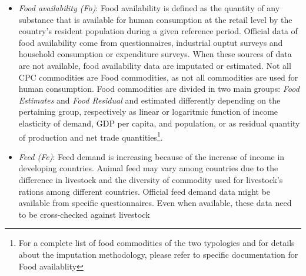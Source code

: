 \documentclass[]{article}
\let\rmarkdownfootnote\footnote%
\def\footnote{\protect\rmarkdownfootnote}
\begin{document}
\begin{itemize}
  tipically limited to a short number of commodities, mainly grains,
  pulses and sugar and, because they are very rarely measured by
  country, figures are very often imputed or estimated\footnote{For a
    complete list of stock commodities and for details about the
    imputation methodology, please refer to specific documentation for
    stock}. Estimation of Changes in stock is based on opening stocks
  figures throught an approach that mantain time consistency of
  available data and official data\footnote{All data are marked as
    \(official\), \(semi-official\) or \emph{unofficial}, depending on
    the source they come from, throught \(flags\). Flag management is
    one of the core responsibilities of the \emph{Office of the Chief
    Statistician} Department in FAO. Flags are used from all the
    estimation procedure for distinguishing between different level of
    reliability in the data. The most reliable data are used to estimate
    missing or less reliable data.{[}this has to be better specified{]}}.
\item
  \emph{Food availability (Fo)}: Food availability is defined as the
  quantity of any substance that is available for human consumption at
  the retail level by the country's resident population during a given
  reference period. Official data of food availability come from
  questionnaires, industrial ouptut surveys and household consumption or
  expenditure surveys. When these sources of data are not available,
  food availability data are imputated or estimated. Not all CPC
  commodities are Food commodities, as not all commodities are used for
  human consumption. Food commodities are divided in two main groups:
  \emph{Food Estimates} and \emph{Food Residual} and estimated
  differently depending on the pertaining group, respectively as linear
  or logaritmic function of income elasticity of demand, GDP per capita,
  and population, or as residual quantity of production and net trade
  quantities\footnote{For a complete list of food commodities of the two
    typologies and for details about the imputation methodology, please
    refer to specific documentation for Food availablity}.
\item
  \emph{Feed (Fe)}: Feed demand is increasing because of the increase of
  income in developing countries. Animal feed may vary among countries
  due to the difference in livestock and the diversity of commodity used
  for livestock's rations among different countries. Official feed
  demand data might be available from specific questionnaires. Even when
  available, these data need to be cross-checked against livestock

\end{itemize}
\end{document}
